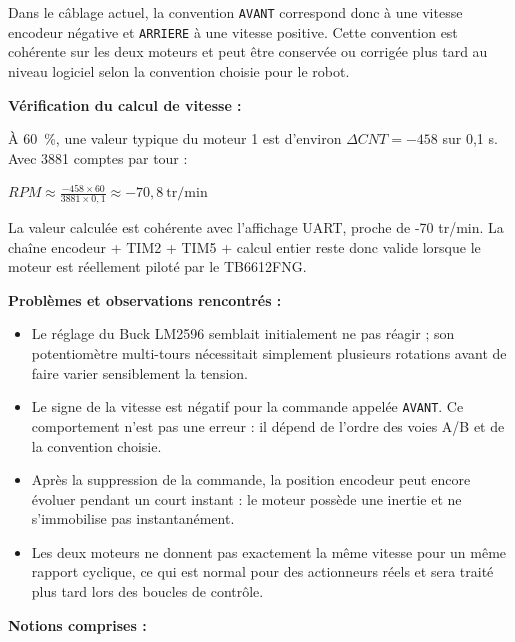 \documentclass[11pt,a4paper]{article}
\begin{document}
\begin{sessionbox}
		Dans le câblage actuel, la convention \texttt{AVANT} correspond donc à une vitesse encodeur négative et \texttt{ARRIERE} à une vitesse positive. Cette convention est cohérente sur les deux moteurs et peut être conservée ou corrigée plus tard au niveau logiciel selon la convention choisie pour le robot.
		
		\vspace{0.3cm}
		
		\textbf{Vérification du calcul de vitesse :}
		
		À 60~\%, une valeur typique du moteur 1 est d'environ $\Delta CNT = -458$ sur 0,1 s. Avec 3881 comptes par tour :
		
		\begin{center}
			$RPM \approx \frac{-458 \times 60}{3881 \times 0,1} \approx -70,8~\mathrm{tr/min}$
		\end{center}
		
		La valeur calculée est cohérente avec l'affichage UART, proche de -70 tr/min. La chaîne encodeur + TIM2 + TIM5 + calcul entier reste donc valide lorsque le moteur est réellement piloté par le TB6612FNG.
		
		\vspace{0.3cm}
		
		\textbf{Problèmes et observations rencontrés :}
		
		\begin{itemize}
			\item Le réglage du Buck LM2596 semblait initialement ne pas réagir ; son potentiomètre multi-tours nécessitait simplement plusieurs rotations avant de faire varier sensiblement la tension.
			\item Le signe de la vitesse est négatif pour la commande appelée \texttt{AVANT}. Ce comportement n'est pas une erreur : il dépend de l'ordre des voies A/B et de la convention choisie.
			\item Après la suppression de la commande, la position encodeur peut encore évoluer pendant un court instant : le moteur possède une inertie et ne s'immobilise pas instantanément.
			\item Les deux moteurs ne donnent pas exactement la même vitesse pour un même rapport cyclique, ce qui est normal pour des actionneurs réels et sera traité plus tard lors des boucles de contrôle.
		\end{itemize}
		
		\vspace{0.3cm}
		
		\textbf{Notions comprises :}
		

\end{sessionbox}
\end{document}
